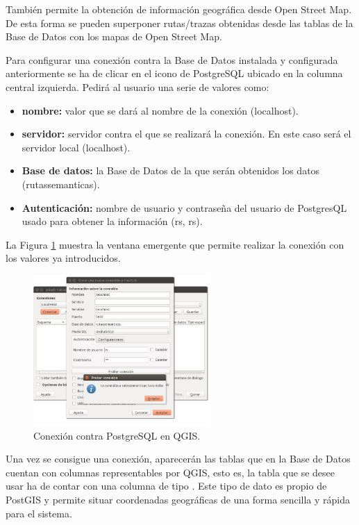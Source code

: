 También permite la obtención de información geográfica desde Open Street Map. De esta forma se pueden superponer rutas/trazas obtenidas desde las tablas de la Base de Datos con los mapas de Open Street Map.

Para configurar una conexión contra la Base de Datos instalada y configurada anteriormente se ha de clicar en el icono de PostgreSQL ubicado en la columna central izquierda. Pedirá al usuario una serie de valores como:

\begin{itemize}
\item \textbf{nombre:} valor que se dará al nombre de la conexión (localhost).
\item \textbf{servidor:} servidor contra el que se realizará la conexión. En este caso será el servidor local (localhost).
\item \textbf{Base de datos:} la Base de Datos de la que serán obtenidos los datos (rutassemanticas).
\item \textbf{Autenticación:} nombre de usuario y contraseña  del usuario de PostgresQL usado para obtener la información (rs, rs).
\end{itemize}

La Figura \ref{conexionqgis} muestra la ventana emergente que permite realizar la conexión con los valores ya introducidos.

\begin{figure}[h]
  \centering
    \includegraphics[width=0.6\textwidth]{../img/qgis/conexionqgis.jpg}
  \caption{Conexión contra PostgreSQL en QGIS.}
  \label{conexionqgis}
\end{figure}

Una vez se consigue una conexión, aparecerán las tablas que en la Base de Datos cuentan con columnas representables por QGIS, esto es, la tabla que se desee usar ha de contar con una columna de tipo . Este tipo de dato es propio de PostGIS y permite situar coordenadas geográficas de una forma sencilla y rápida para el sistema.

